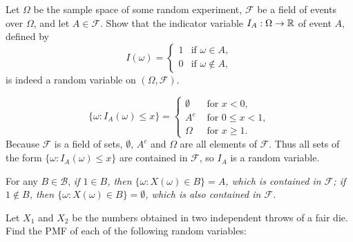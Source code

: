 \begin{exercise}
\begin{questions}
\question
Let $\Omega$ be the sample space of some random experiment, $\mathcal{F}$ be a field of events over $\Omega$, and let $A\in\mathcal{F}$. Show that the indicator variable $I_A:\Omega\to\mathbb{R}$ of event $A$, defined by
\[
I(\omega) =
  \begin{cases}
   1 & \text{if } \omega\in A, \\
   0 & \text{if } \omega\notin A,
  \end{cases}
\]
is indeed a random variable on $(\Omega,\mathcal{F})$.
\begin{answer}
\[
\{\omega:I_A(\omega) \leq x\} = \begin{cases}
	\emptyset	& \text{ for } x < 0, \\
	A^c			& \text{ for } 0 \leq x < 1, \\
	\Omega		& \text{ for } x \geq 1.
	\end{cases}
\]
Because $\mathcal{F}$ is a field of sets, $\emptyset$, $A^c$ and $\Omega$ are all elements of $\mathcal{F}$. Thus all sets of the form $\{\omega:I_A(\omega) \leq x\}$ are contained in $\mathcal{F}$, so $I_A$ is a random variable.

For any $B\in\mathcal{B}$,
\bit
\it if $1\in B$, then $\{\omega:X(\omega)\in B\} = A$, which is contained in $\mathcal{F}$;
\it if $1\notin B$, then $\{\omega:X(\omega)\in B\} = \emptyset$, which is also contained in $\mathcal{F}$.
\eit
\end{answer}

\question
Let $X_1$ and $X_2$ be the numbers obtained in two independent throws of a fair die. Find the PMF of each of the following random variables:
\end{questions}
\end{exercise}
